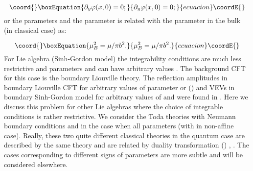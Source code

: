 \documentclass[a4paper,12pt]{article}
\begin{document}
\begin{equation}\coord{}\boxEquation{
\partial _y\varphi (x,0)=0;  \label{N}
}{
\partial _y\varphi (x,0)=0;  }{ecuacion}\coordE{}\end{equation}
or the parameters \coordHE{} and the parameter \coordHE{} is related with the
parameter \myHighlight{$\mu $}\coordHE{} in the bulk (in classical case) as:

\begin{equation}\coord{}\boxEquation{
\mu _B^2=\mu /\pi b^2.  \label{ND}
}{
\mu _B^2=\mu /\pi b^2.  }{ecuacion}\coordE{}\end{equation}
For Lie algebra \coordHE{} (Sinh-Gordon model) the integrability conditions are
much less restrictive and parameters \coordHE{} and \coordHE{} can have arbitrary
values \cite{GZ}. The background CFT for this case is the boundary Liouville
theory. The reflection amplitudes in boundary Liouville CFT for arbitrary
values of parameter \coordHE{} or (\coordHE{}) and VEVs in boundary 
Sinh-Gordon model for
arbitrary values of \coordHE{} and \coordHE{} were found in \cite{FZZA} .
Here we discuss this problem for other Lie algebras where the choice of
integrable conditions is rather restrictive. We consider the Toda theories
with Neumann boundary conditions and in the case when all parameters \coordHE{}
(with \coordHE{} in non-affine case). Really, these two quite different
classical theories in the quantum case are described by the same
theory and are related by duality transformation (\coordHE{})
\cite{CRG}, \cite{GHB}. The
cases corresponding to different signs of parameters \coordHE{} are more subtle
and will be considered elsewhere.
\end{document}
